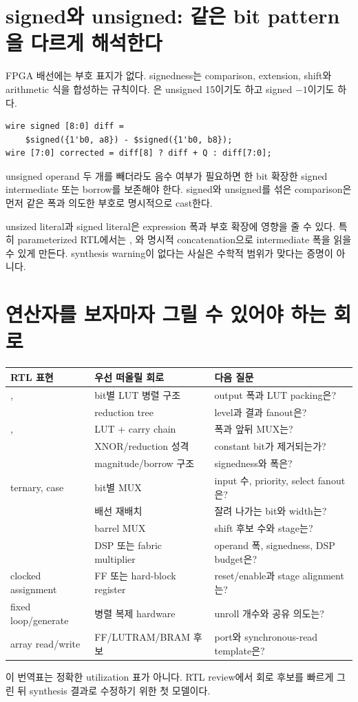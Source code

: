 \section{signed와 unsigned: 같은 bit pattern을 다르게 해석한다}

FPGA 배선에는 부호 표지가 없다. signedness는 comparison, extension, shift와
arithmetic 식을 합성하는 규칙이다. 은 unsigned 15이기도 하고
signed $-1$이기도 하다.

\begin{lstlisting}
wire signed [8:0] diff =
    $signed({1'b0, a8}) - $signed({1'b0, b8});
wire [7:0] corrected = diff[8] ? diff + Q : diff[7:0];
\end{lstlisting}

unsigned operand 두 개를 빼더라도 음수 여부가 필요하면 한 bit 확장한 signed
intermediate 또는 borrow를 보존해야 한다. signed와 unsigned를 섞은 comparison은
먼저 같은 폭과 의도한 부호로 명시적으로 cast한다.

\begin{warningbox}
unsized literal과 signed literal은 expression 폭과 부호 확장에 영향을 줄 수
있다. 특히 parameterized RTL에서는 , 와
명시적 concatenation으로 intermediate 폭을 읽을 수 있게 만든다. synthesis
warning이 없다는 사실은 수학적 범위가 맞다는 증명이 아니다.
\end{warningbox}

\section{연산자를 보자마자 그릴 수 있어야 하는 회로}

\begin{longtable}{L{35mm}L{52mm}L{72mm}}
\toprule
RTL 표현 & 우선 떠올릴 회로 & 다음 질문 \\
\midrule
\endhead
{},  & bit별 LUT 병렬 구조 & output 폭과 LUT packing은? \\
 & reduction tree & level과 결과 fanout은? \\
,  & LUT + carry chain & 폭과 앞뒤 MUX는? \\
 & XNOR/reduction 성격 & constant bit가 제거되는가? \\
 & magnitude/borrow 구조 & signedness와 폭은? \\
ternary, case & bit별 MUX & input 수, priority, select fanout은? \\
 & 배선 재배치 & 잘려 나가는 bit와 width는? \\
 & barrel MUX & shift 후보 수와 stage는? \\
 & DSP 또는 fabric multiplier & operand 폭, signedness, DSP budget은? \\
clocked assignment & FF 또는 hard-block register & reset/enable과 stage alignment는? \\
fixed loop/generate & 병렬 복제 hardware & unroll 개수와 공유 의도는? \\
array read/write & FF/LUTRAM/BRAM 후보 & port와 synchronous-read template은? \\
\bottomrule
\end{longtable}

이 번역표는 정확한 utilization 표가 아니다. RTL review에서 회로 후보를 빠르게
그린 뒤 synthesis 결과로 수정하기 위한 첫 모델이다.
